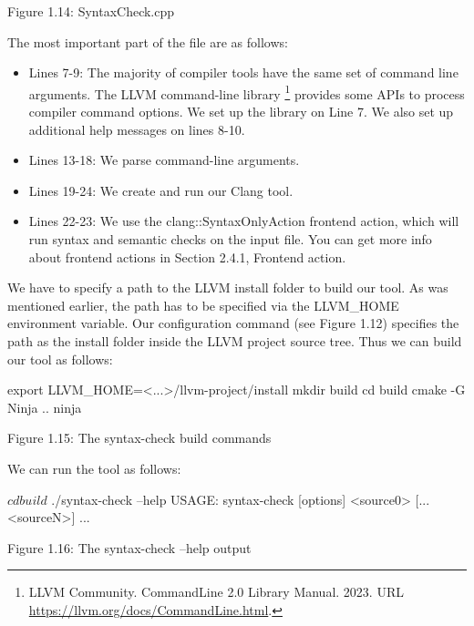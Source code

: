 \begin{center}
Figure 1.14: SyntaxCheck.cpp
\end{center}

The most important part of the file are as follows:

\begin{itemize}
\item
Lines 7-9: The majority of compiler tools have the same set of command line arguments. The LLVM command-line library \footnote{LLVM Community. CommandLine 2.0 Library Manual. 2023. URL \url{https://llvm.org/docs/CommandLine.html}.} provides some APIs to process compiler command options. We set up the library on Line 7. We also set up additional help messages on lines 8-10.

\item
Lines 13-18: We parse command-line arguments.

\item
Lines 19-24: We create and run our Clang tool.

\item
Lines 22-23: We use the clang::SyntaxOnlyAction frontend action, which will run syntax and semantic checks on the input file. You can get more info about frontend actions in Section 2.4.1, Frontend action.
\end{itemize}

We have to specify a path to the LLVM install folder to build our tool. As was mentioned earlier, the path has to be specified via the LLVM\_HOME environment variable. Our configuration command (see Figure 1.12) specifies the path as the install folder inside the LLVM project source tree. Thus we can build our tool as follows:

\begin{shell}
export LLVM_HOME=<...>/llvm-project/install
mkdir build
cd build
cmake -G Ninja ..
ninja
\end{shell}

\begin{center}
Figure 1.15: The syntax-check build commands
\end{center}

We can run the tool as follows:

\begin{shell}
$ cd build
$ ./syntax-check --help
USAGE: syntax-check [options] <source0> [... <sourceN>]
...
\end{shell}

\begin{center}
Figure 1.16: The syntax-check –help output
\end{center}

